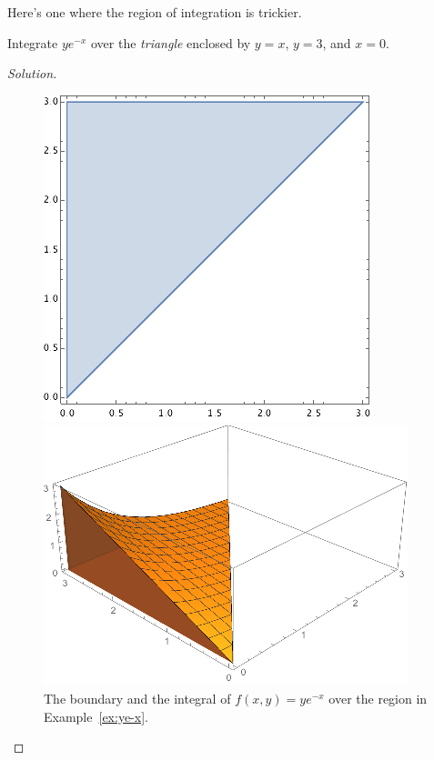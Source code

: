 \documentclass[11 pt]{scrartcl}
\begin{document}
Here's one where the region of integration is trickier. 

\begin{example}
    Integrate $ye^{-x}$ over the \emph{triangle} enclosed by $y = x$, $y = 3$, and $x = 0$. 
    \label{ex:ye-x}
\end{example}
\begin{proof}[Solution]
    \begin{figure}[!htb]
        \centering
        \begin{minipage}{0.45\linewidth}
            \includegraphics[scale=0.35]{boundary.png}
        \end{minipage}%
        \begin{minipage}{0.45\linewidth}
            \includegraphics[scale=0.45]{ye-x.png}
        \end{minipage}%
        \caption{The boundary and the integral of $f(x,y) = ye^{-x}$ over the region in Example~\ref{ex:ye-x}.}
    \end{figure}


\end{proof}
\end{document}
